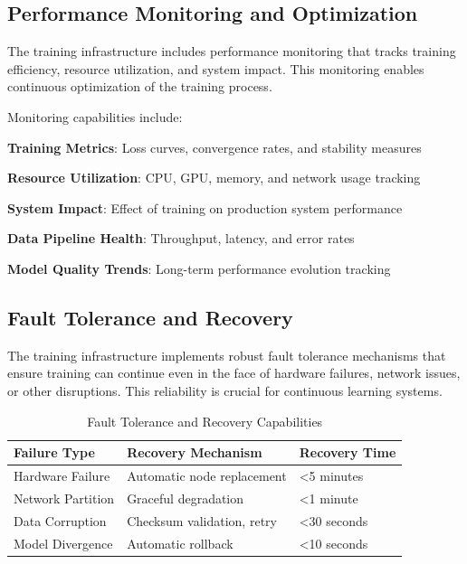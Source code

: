 \subsection*{Performance Monitoring and Optimization}

The training infrastructure includes performance monitoring that tracks training efficiency, resource utilization, and system impact. This monitoring enables continuous optimization of the training process.

Monitoring capabilities include:

\begin{expandedlist}
    \item \textbf{Training Metrics}: Loss curves, convergence rates, and stability measures
    \item \textbf{Resource Utilization}: CPU, GPU, memory, and network usage tracking
    \item \textbf{System Impact}: Effect of training on production system performance
    \item \textbf{Data Pipeline Health}: Throughput, latency, and error rates
    \item \textbf{Model Quality Trends}: Long-term performance evolution tracking
\end{expandedlist}

\subsection*{Fault Tolerance and Recovery}

The training infrastructure implements robust fault tolerance mechanisms that ensure training can continue even in the face of hardware failures, network issues, or other disruptions. This reliability is crucial for continuous learning systems.

\begin{table}[ht]
\centering
\begin{tabular}{@{}lll@{}}
\toprule
\textbf{Failure Type} & \textbf{Recovery Mechanism} & \textbf{Recovery Time} \\
\midrule
Hardware Failure & Automatic node replacement & <5 minutes \\
Network Partition & Graceful degradation & <1 minute \\
Data Corruption & Checksum validation, retry & <30 seconds \\
Model Divergence & Automatic rollback & <10 seconds \\
\bottomrule
\end{tabular}
\caption{Fault Tolerance and Recovery Capabilities}
\end{table}

